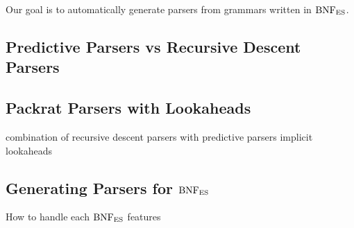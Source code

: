 Our goal is to automatically generate parsers from grammars written in \( \text{BNF}_{\text{ES}} \).

% 
% 
% 
% 
% 
% 
% 



\subsection{Predictive Parsers vs Recursive Descent Parsers}


\subsection{Packrat Parsers with Lookaheads}
combination of recursive descent parsers with predictive parsers
implicit lookaheads

\subsection{Generating Parsers for \( \text{BNF}_{\text{ES}} \)}
How to handle each \( \text{BNF}_{\text{ES}} \) features
